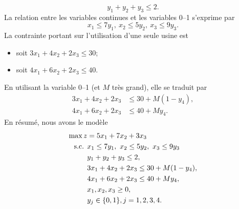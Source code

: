 \begin{example}
\[
y_1 + y_2 + y_3 \leq 2.
\]
La relation entre les variables continues et les variables 0--1 s'exprime par
\[
x_1 \leq 7y_1,\ x_2 \leq 5y_2,\ x_3 \leq 9y_3.
\]
La contrainte portant sur l'utilisation d'une seule usine est
\begin{itemize}
\item
soit $3x_1 + 4x_2 + 2x_3 \leq 30$;
\item
soit $4x_1 + 6x_2 + 2x_3 \leq 40$.
\end{itemize}
En utilisant la variable 0--1 (et $M$ très grand), elle se traduit par
\begin{align*}
3x_1 + 4x_2 + 2x_3 &\leq 30 + M(1-y_4), \\
4x_1 + 6x_2 + 2x_3 &\leq 40 + My_4.
\end{align*}
En résumé, nous avons le modèle
\begin{align*}
\max z &= 5x_1 + 7x_2 + 3x_3\\
\mbox{s.c. } & x_1 \leq 7y_1,\ x_2 \leq 5y_2,\ x_3 \leq 9y_3\\
& y_1 + y_2 + y_3 \leq 2,\\
& 3x_1 + 4x_2 + 2x_3 \leq 30 + M(1-y_4), \\
& 4x_1 + 6x_2 + 2x_3 \leq 40 + My_4, \\
& x_1, x_2, x_3 \geq 0,\\
& y_j \in \lbrace 0,1 \rbrace, j = 1,2,3,4.
\end{align*}
\end{example}

